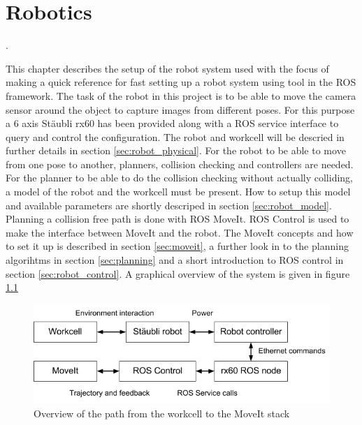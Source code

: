 \chapter{Robotics}
.

This chapter describes the setup of the robot system used with the focus of making a quick reference for fast setting up a robot system using tool in the ROS framework. The task of the robot in this project is to be able to move the camera sensor around the object to capture images from different poses. For this purpose a 6 axis Stäubli rx60 has been provided along with a ROS service interface to query and control the configuration. The robot and workcell will be descried in further details in section \ref{sec:robot_physical}. For the robot to be able to move from one pose to another, planners, collision checking and controllers are needed. For the planner to be able to do the collision checking without actually colliding, a model of the robot and the workcell must be present. How to setup this model and available parameters are shortly descriped in section \ref{sec:robot_model}. Planning a collision free path is done with ROS MoveIt. ROS Control is used to make the interface between MoveIt and the robot. The MoveIt concepts and how to set it up is described in section \ref{sec:moveit}, a further look in to the planning algorihtms in section \ref{sec:planning} and a short introduction to ROS control in section \ref{sec:robot_control}. A graphical overview of the system is given in figure \ref{fig:workcell_to_moveit_path}

\begin{figure}[htb]
	\begin{center}
		\includegraphics[scale=0.5,trim=0 0 0 0]{graphics/05_robotics/workcell_to_moveIt_path.png}%
		\caption{Overview of the path from the workcell to the MoveIt stack}
		\label{fig:workcell_to_moveit_path}
	\end{center}
\end{figure}

